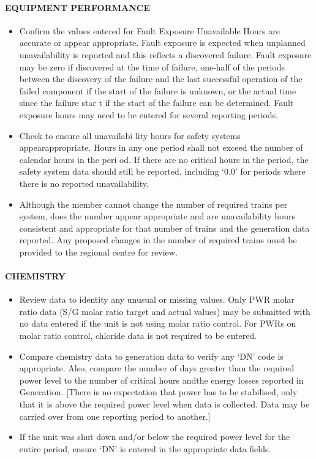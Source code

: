 \paragraph{EQUIPMENT PERFORMANCE}
\begin{itemize}
\item Confirm the values entered for Fault Exposure Unavailable Hours are
accurate or appear appropriate.  Fault exposure is expected when
unplanned unavailability is reported and this reflects a discovered failure.
Fault exposure may be zero if discovered at the time of failure, one-half of
the periods between the discovery of the failure and the last successful
operation of the failed component if the start of the
failure is unknown, or the actual time since the failure star
t if the start of the failure can be determined. Fault exposure hours
may need to be entered for several reporting periods.
\item Check to ensure all unavailabi
lity hours for safety systems appearappropriate. Hours in any one period
shall not exceed the number of calendar hours in the peri
od. If there are no critical hours in the period, the
safety system data should still be reported, including ‘0.0’ for periods
where there is no reported unavailability.
\item Although the member cannot change the number of
 required trains per system, does the number appear appropriate and are unavailability hours
consistent and appropriate for that number of trains and the generation
data reported. Any proposed changes in the number of required trains
must be provided to the regional centre for review.
\end{itemize}

\paragraph{CHEMISTRY}
\begin{itemize}
\item Review data to identity any unusual or missing values. Only PWR molar
ratio data (S/G molar ratio target and actual values) may be submitted with
no data entered if the unit is not using molar ratio control. For PWRs on
molar ratio control, chloride data is not required to be entered.
\item Compare chemistry data to generation data to verify any ‘DN’ code is
appropriate. Also, compare the number of days greater than the required
power level to the number of critical hours andthe energy losses reported
in Generation. [There is no expectation that power has to be stabilised,
only that it is above the required power level when data is collected. Data
may be carried over from one reporting period to another.]
\item If the unit was shut down and/or below the required power level for the
entire period, ensure ‘DN’ is entered in the appropriate data fields.
\end{itemize}


